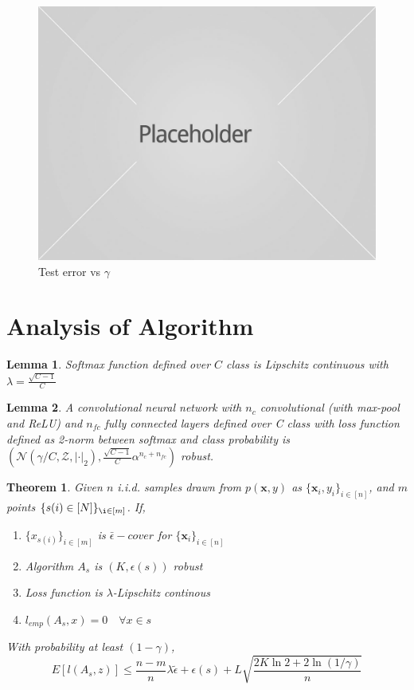 \documentclass{article}
\newtheorem{theorem}{Theorem}
\newtheorem{lemma}{Lemma}
\begin{document}
\begin{figure}[h]
\includegraphics[width=\columnwidth]{placeholder1.jpg}
\caption{Test error vs $\gamma$}
\label{mip}
\end{figure}




\section{Analysis of Algorithm}

\begin{lemma}
Softmax function defined over $C$ class is  Lipschitz continuous with $\lambda=\frac{\sqrt{C-1}}{C}$
\end{lemma}

\begin{lemma}
A convolutional neural network with $n_c$ convolutional (with max-pool and ReLU) and $n_{fc}$ fully connected layers defined over C class with loss function defined as 2-norm between softmax and class probability is $(\mathcal{N}(\gamma/C,\mathcal{Z},|\cdot|_2),  \frac{\sqrt{C-1}}{C} \alpha^{n_c+n_{fc}})$ robust.
\end{lemma}


\begin{theorem}
Given $n$ i.i.d. samples drawn from $p(\mathbf{x},y)$ as $\{\mathbf{x}_i,y_i\}_{i\in[n]}$, and $m$ points $\{ s(i) \in [N]\}_{\i \in [m]}$. If,
\begin{enumerate}
\item  $\{x_{s(i)}\}_{i \in [m]}$ is $\bar{\epsilon}-cover$ for  $\{\mathbf{x}_i\}_{i\in[n]}$
\item Algorithm $A_s$ is $(K,\epsilon(s))$ robust
\item Loss function is $\lambda$-Lipschitz continous
\item $l_{emp}(A_s,x)=0\quad \forall x \in s$
\end{enumerate}
With probability at least $(1-\gamma)$,
\[
E[l(A_s,z)] \leq \frac{n-m}{n} \lambda \tilde{\epsilon} + \epsilon(s) + L \sqrt{\frac{2K\ln 2 + 2\ln (1/\gamma)}{n}}
\]
\label{mainthm}
\end{theorem}
\end{document}
